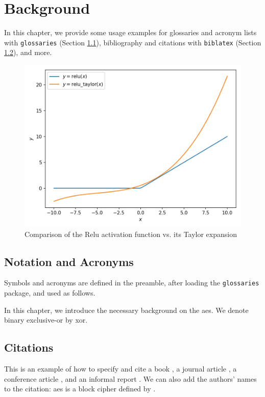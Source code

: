 \chapter{Background}
\label{chap:background}
In this chapter, we provide some usage examples for
glossaries and acronym lists with \texttt{glossaries} (Section \ref{sec:gloss}),
bibliography and citations with \texttt{biblatex} (Section \ref{sec:bib}), and more.

\begin{figure}[H]
    \centering
    \includegraphics[width=0.8\linewidth]{figures/taylor-relu.png}
    \caption{Comparison of the Relu activation function vs. its Taylor expansion}
\end{figure}

\section{Notation and Acronyms}
\label{sec:gloss}
Symbols and acronyms are defined in the preamble, after loading the \texttt{glossaries} package, and used as follows.

In this chapter, we introduce the necessary background on the \gls{aes}.
We denote binary exclusive-or by \gls{xor}.

\section{Citations}
\label{sec:bib}
This is an example of how to specify and cite
a book \cite{AESbook},
a journal article \cite{bstjShannon49},
a conference article \cite{spKocherHFGGHHLM019},
and an informal report \cite{iacrSchneierFKR15}.
We can also add the authors' names to the citation:
\Gls{aes} is a block cipher defined by \textcite{AESbook}.
